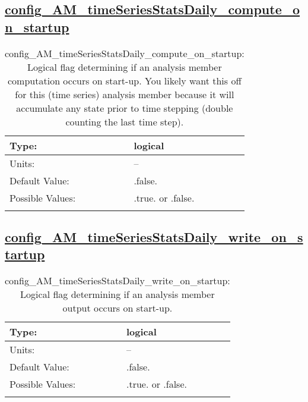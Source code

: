 \subsection[config\_AM\_timeSeriesStatsDaily\_compute\_on\_startup]{\hyperref[sec:nm_tab_AM_timeSeriesStatsDaily]{config\_AM\_timeSeriesStatsDaily\_compute\_on\_startup}}
\label{subsec:nm_sec_config_AM_timeSeriesStatsDaily_compute_on_startup}
\begin{center}
\begin{longtable}{| p{2.0in} || p{4.0in} |}
    \hline
    Type: & logical \\
    \hline
    Units: & -- \\
    \hline
    Default Value: & .false. \\
    \hline
    Possible Values: & .true. or .false. \\
    \hline
    \caption{config\_AM\_timeSeriesStatsDaily\_compute\_on\_startup: Logical flag determining if an analysis member computation occurs on start-up. You likely want this off for this (time series) analysis member because it will accumulate any state prior to time stepping (double counting the last time step).}
\end{longtable}
\end{center}
\subsection[config\_AM\_timeSeriesStatsDaily\_write\_on\_startup]{\hyperref[sec:nm_tab_AM_timeSeriesStatsDaily]{config\_AM\_timeSeriesStatsDaily\_write\_on\_startup}}
\label{subsec:nm_sec_config_AM_timeSeriesStatsDaily_write_on_startup}
\begin{center}
\begin{longtable}{| p{2.0in} || p{4.0in} |}
    \hline
    Type: & logical \\
    \hline
    Units: & -- \\
    \hline
    Default Value: & .false. \\
    \hline
    Possible Values: & .true. or .false. \\
    \hline
    \caption{config\_AM\_timeSeriesStatsDaily\_write\_on\_startup: Logical flag determining if an analysis member output occurs on start-up.}
\end{longtable}
\end{center}
